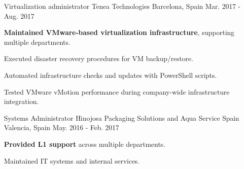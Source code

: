 \begin{cventries}
\cventry
{Virtualization administrator} %
{Tenea Technologies} %
{Barcelona, Spain} %
{Mar. 2017 - Aug. 2017} %
{ %
	\begin{cvitems}
		\item{\textbf{Maintained VMware-based virtualization infrastructure}, supporting multiple departments.}
		\item{Executed disaster recovery procedures for VM backup/restore.}
        \item{Automated infrastructure checks and updates with PowerShell scripts.}
        \item{Tested VMware vMotion performance during company-wide infrastructure integration.}        
	\end{cvitems}
}
\cventry
{Systems Administrator} %
{Hinojosa Packaging Solutions and Aqua Service Spain } %
{Valencia, Spain} %
{May. 2016 - Feb. 2017} %
{ %
	\begin{cvitems}
		\item{\textbf{Provided L1 support} across multiple departments.}
		\item{Maintained IT systems and internal services.}
	\end{cvitems}
}

\end{cventries}

